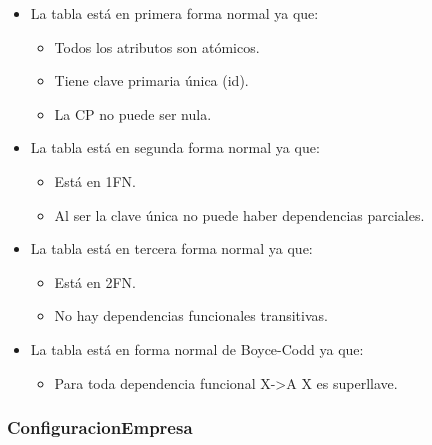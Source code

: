 \documentclass[12pt,a4paperpaper,]{report}
\providecommand{\tightlist}{%
  \setlength{\itemsep}{0pt}\setlength{\parskip}{0pt}}
\begin{document}
\begin{itemize}
\tightlist
\item
  La tabla está en primera forma normal ya que:

  \begin{itemize}
  \tightlist
  \item
    Todos los atributos son atómicos.
  \item
    Tiene clave primaria única (id).
  \item
    La CP no puede ser nula.
  \end{itemize}
\item
  La tabla está en segunda forma normal ya que:

  \begin{itemize}
  \tightlist
  \item
    Está en 1FN.
  \item
    Al ser la clave única no puede haber dependencias parciales.
  \end{itemize}
\item
  La tabla está en tercera forma normal ya que:

  \begin{itemize}
  \tightlist
  \item
    Está en 2FN.
  \item
    No hay dependencias funcionales transitivas.
  \end{itemize}
\item
  La tabla está en forma normal de Boyce-Codd ya que:

  \begin{itemize}
  \tightlist
  \item
    Para toda dependencia funcional X-\textgreater{}A X es superllave.
  \end{itemize}
\end{itemize}

\subsubsection{ConfiguracionEmpresa}\label{configuracionempresa}
\end{document}

